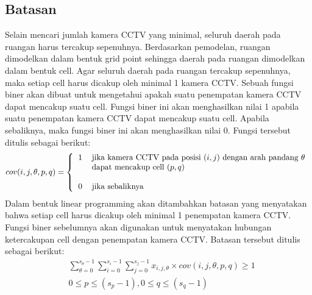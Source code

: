 \subsection{Batasan}
Selain mencari jumlah kamera CCTV yang minimal, seluruh daerah pada ruangan harus tercakup sepenuhnya. Berdasarkan pemodelan, ruangan dimodelkan dalam bentuk grid point sehingga daerah pada ruangan dimodelkan dalam bentuk cell. Agar seluruh daerah pada ruangan tercakup sepenuhnya, maka setiap cell harus dicakup oleh minimal 1 kamera CCTV. Sebuah fungsi biner akan dibuat untuk mengetahui apakah suatu penempatan kamera CCTV dapat mencakup suatu cell. Fungsi biner ini akan menghasilkan nilai 1 apabila suatu penempatan kamera CCTV dapat mencakup suatu cell. Apabila sebaliknya, maka fungsi biner ini akan menghasilkan nilai 0. Fungsi tersebut ditulis sebagai berikut:
\begin{equation*}
	cov(i,j,\theta,p,q) =
	\left \{
		\begin{tabular}{cl}
			1 & jika kamera CCTV pada posisi $(i,j)$ dengan arah pandang $\theta$\\
  			  & dapat mencakup cell $(p,q)$\\
  			  & \\
  			0 & jika sebaliknya
		\end{tabular}
	\right.
\end{equation*}
Dalam bentuk linear programming akan ditambahkan batasan yang menyatakan bahwa setiap cell harus dicakup oleh minimal 1 penempatan kamera CCTV. Fungsi biner sebelumnya akan digunakan untuk menyatakan hubungan ketercakupan cell dengan penempatan kamera CCTV. Batasan tersebut ditulis sebagai berikut:
\begin{equation*}
	\begin{split}
		& \sum_{\theta=0}^{s_{\theta}-1} \sum_{i=0}^{s_i-1} \sum_{j=0}^{s_j-1} x_{i,j,\theta} \times cov(i,j,\theta,p,q) \geq 1\\
		& 0 \leq p \leq (s_p - 1), 0 \leq q \leq (s_q - 1)
	\end{split}
\end{equation*}

